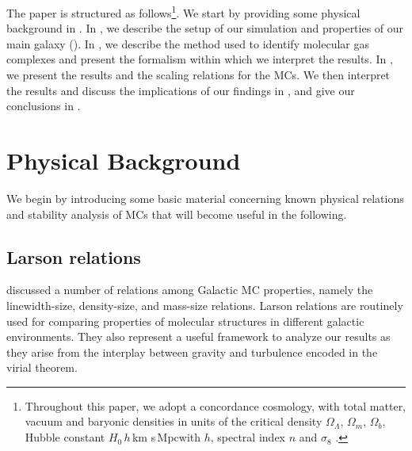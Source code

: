 \IfFileExists{emulateapjlegacy.cls}{\documentclass[iop]{emulateapjlegacy}}{\documentclass[iop]{emulateapj}}
\begin{document}
The paper is structured as follows\footnote{Throughout this paper, we adopt a concordance cosmology, with total matter, vacuum and baryonic densities in units of the critical density $\Omega_{\Lambda}$, $\Omega_m$, $\Omega_b$, Hubble constant $H_0$\,$h$\,km s\pmOne\,Mpc\pmOne with $h$, spectral index $n$ and $\sigma_8$ \citep{Planck14a}.}. We start by providing some physical background in . In , we describe the setup of our simulation and properties of our main galaxy (\flower). In , we describe the method used to identify molecular gas complexes and present the formalism within which we interpret the results. In , we present the results and the scaling relations for the MCs. We then interpret the results and discuss the implications of our findings in , and give our conclusions in .
%
\section{Physical Background}\label{sec:Back}
We begin by introducing some basic material concerning known physical relations and stability analysis of MCs that will become useful in the following.
\subsection{Larson relations}\label{sec:PVE}
\citep{Larson81a} discussed a number of relations among Galactic MC properties, namely the linewidth-size, density-size, and mass-size relations. Larson relations are routinely used for comparing properties of molecular structures in different galactic environments. They also represent a useful framework to analyze our results as they arise from the interplay between gravity and turbulence encoded in the virial theorem. 
\end{document}
